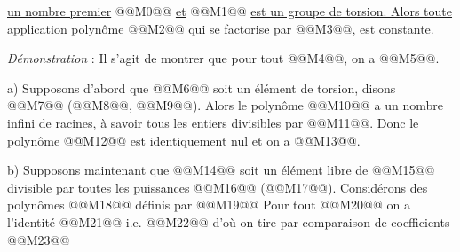 
\uline{un nombre premier} @@M0@@ \uline{et} @@M1@@ \uline{est un groupe de torsion. Alors toute application polynôme} @@M2@@ \uline{qui se factorise par} @@M3@@\uline{, est constante.}

\emph{Démonstration} : Il s'agit de montrer que pour tout @@M4@@, on a @@M5@@.

a) Supposons d'abord que @@M6@@ soit un élément de torsion, disons @@M7@@ (@@M8@@, @@M9@@). Alors le polynôme @@M10@@ a un nombre infini de racines, à savoir tous les entiers divisibles par @@M11@@. Donc le polynôme @@M12@@ est identiquement nul et on a @@M13@@.

b) Supposons maintenant que @@M14@@ soit un élément libre de @@M15@@ divisible par toutes les puissances @@M16@@ (@@M17@@). Considérons des polynômes @@M18@@ définis par
@@M19@@
Pour tout @@M20@@ on a l'identité
@@M21@@
i.e.
@@M22@@
d'où on tire par comparaison de coefficients
@@M23@@
